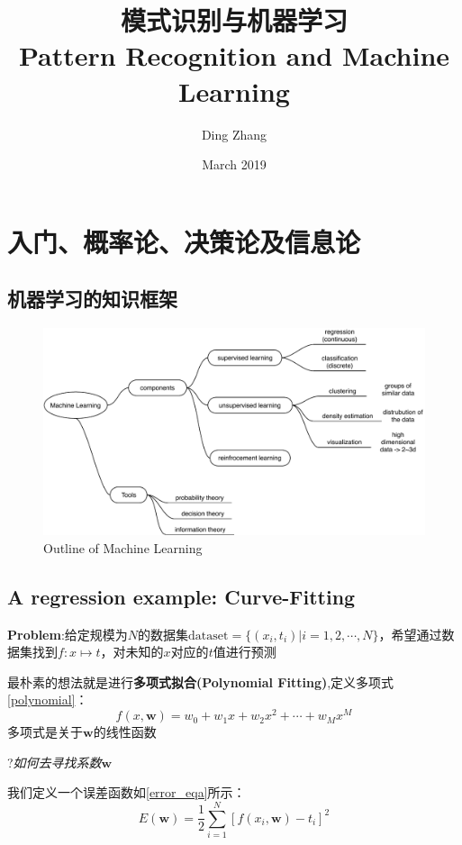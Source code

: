 \documentclass{article}
\title{模式识别与机器学习\\Pattern Recognition and Machine Learning}
\author{Ding Zhang}
\date{March 2019}
\newcommand{\task}[1]{\noindent\textbf{Problem}:#1}
\newcommand{\question}[1]{\noindent?\emph{#1}}
\begin{document}
\maketitle

\section{入门、概率论、决策论及信息论}
\subsection{机器学习的知识框架}
    \begin{figure}[h]
        \centering
        \includegraphics[width=\textwidth]{figures/pattern_recognition_machine_learning-outline.pdf}
        \caption{Outline of Machine Learning}
        \label{fig:outline}
    \end{figure}

\subsection{A regression example: Curve-Fitting}
\task{给定规模为$N$的数据集$\mathrm{dataset}=\{(x_i,t_i) | i=1,2,\cdots,N\}$，希望通过数据集找到$f:x\mapsto t$，对未知的$x$对应的$t$值进行预测}
    
    最朴素的想法就是进行\textbf{多项式拟合(Polynomial Fitting)},定义多项式\ref{polynomial}：
    \begin{equation}
        f(x,\mathbf{w})=w_0+w_1x+w_2x^2+\cdots+w_Mx^M
        \label{polynomial}
    \end{equation}
    多项式是关于\(\mathbf{w}\)的线性函数

\question{如何去寻找系数$\mathbf{w}$}

    我们定义一个误差函数如\ref{error_eqa}所示：
    \begin{equation}
        E(\textbf{w})=\frac{1}{2}\sum_{i=1}^{N}[f(x_i, \textbf{w})-t_i]^2
        \label{error_eqa}
    \end{equation}
    
\end{document}
